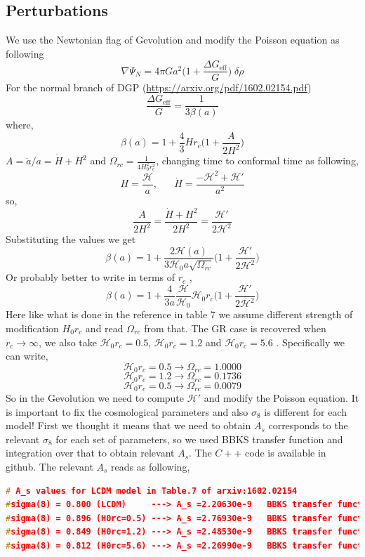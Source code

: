 \documentclass[a4paper,10pt]{article}
\def\be{\begin{equation}}
\def\ee{\end{equation}}
\newcommand{\HH}{\mathcal H}
\begin{document}
\subsection{Perturbations}
We use the Newtonian flag of Gevolution  and modify the Poisson equation as following
 \be
\nabla \Psi_N = 4 \pi G{a^2} \Big(1+ \frac{\Delta G_{\text{eff}}}{G} \Big)\; \delta \rho
  \ee
  For the normal branch of DGP  (\url{https://arxiv.org/pdf/1602.02154.pdf})
\be
\frac{\Delta G_{\text{eff}}}{G} = \frac{1} {3 \beta(a)}
\ee
where,
\be
\beta(a) = 1+ \frac4 3 H r_c \Big ( 1+ \frac{A}{2 H^2} \Big) 
\ee
$A=\ddot{a}/a = \dot{H} + H^2  $ and $\Omega_{rc} = \frac{1}{4 H_0^2 r_c^2}$, changing time to conformal time as following,
\be
H = \frac{\HH}{a}, \; \; \; \; \; \; \dot{H} = \frac{-\HH^2 + \HH'}{a^2}
\ee
so,
\be
\frac{A}{2H^2}= \frac{ \dot{H} + H^2 }{2H^2}  = \frac{\HH' }{2 \HH^2}
\ee
Substituting the values we get
\be
\beta(a) = 1+ \frac{2 \HH(a)} {3 \HH_0 a \sqrt{\Omega_{rc}} }   \Big ( 1+ \frac{\HH'}{2 \HH^2} \Big) 
\ee
Or probably better to write in terms of $r_c$ ,
\be
\beta(a) = 1+ \frac{4} {3 a }  \frac{\HH}{\HH_0} \HH_0 r_c    \Big ( 1+ \frac{\HH'}{2 \HH^2} \Big) 
\ee
Here like what is done in the reference in table 7 we assume different strength of modification $H_0 r_c$ and read $\Omega_{rc}$ from that. The GR case is  recovered when $r_c \to \infty$, we also take $\HH_0 r_c = 0.5$, $\HH_0 r_c = 1.2$ and $\HH_0 r_c = 5.6$ . Specifically we can write,\\
\be
 \HH_0 r_c = 0.5 \longrightarrow \Omega_{rc} =1.0000
 \ee
 \be
 \HH_0 r_c = 1.2 \longrightarrow \Omega_{rc} =0.1736
 \ee
 \be
 \HH_0 r_c = 0.5 \longrightarrow \Omega_{rc} =0.0079
 \ee
 So in the Gevolution we need to compute $\HH'$ and modify the Poisson equation. It is important to fix the cosmological parameters and also $\sigma_8$ is different for each model! First we thought it means that we need to obtain $A_s$ corresponds to the relevant $\sigma_8$ for each set of parameters, so we used BBKS transfer function and integration over that to obtain relevant $A_s$. The $C++$ code is available in github. The relevant $A_s$ reads as following,
   \begin{lstlisting}[language=C++,
  basicstyle=\tiny]
 # A_s values for LCDM model in Table.7 of arxiv:1602.02154
#sigma(8) = 0.800 (LCDM)     ---> A_s =2.20630e-9   BBKS transfer function integration
#sigma(8) = 0.896 (H0rc=0.5) ---> A_s =2.76930e-9   BBKS transfer function integration
#sigma(8) = 0.849 (H0rc=1.2) ---> A_s =2.48530e-9   BBKS transfer function integration
#sigma(8) = 0.812 (H0rc=5.6) ---> A_s =2.26990e-9   BBKS transfer function integration
 \end{lstlisting}
\end{document}
